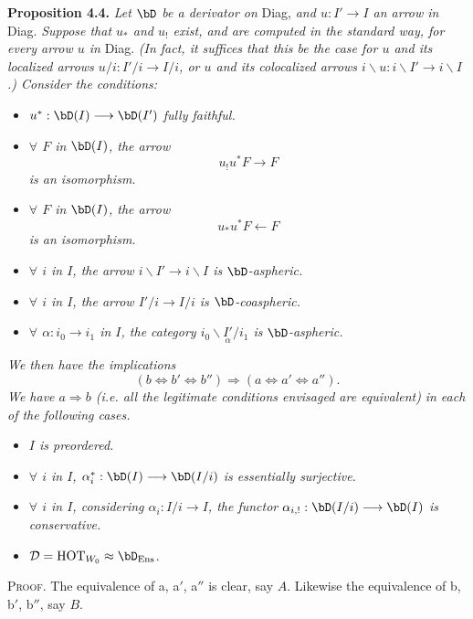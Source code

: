 \textbf{Proposition 4.4.} \textit{Let $\bD$ be a derivator on} Diag, \textit{and $u : I' \longrightarrow I$ an arrow in} Diag. \textit{Suppose that $u_*$ and $u_!$ exist, and are computed in the standard way, for every arrow $u$ in} Diag. \textit{(In fact, it suffices that this be the case for $u$ and its localized arrows $u/i : I'/i \longrightarrow I/i$, or $u$ and its colocalized arrows $i\backslash u : i\backslash I' \longrightarrow i\backslash I$.) Consider the conditions:} %
\begin{itemize}[leftmargin=4em]
\item[\textit{a)}] $u^* : \bD(I) \longrightarrow \bD(I')$ \textit{fully faithful.}
\item[\textit{a$'$)}] \textit{$\forall$ $F$ in $\bD(I)$, the arrow}
\[
u_!u^*F \longrightarrow F
\]
\textit{is an isomorphism.}
\item[\textit{a$''$)}] \textit{$\forall$ $F$ in $\bD(I)$, the arrow}
\[
u_*u^*F \longleftarrow F
\]
\textit{is an isomorphism.}
\item[\textit{b)}] \textit{$\forall$ $i$ in $I$, the arrow $i\backslash I' \longrightarrow i\backslash I$ is $\bD$-aspheric.}
\item[\textit{b$'$)}] \textit{$\forall$ $i$ in $I$, the arrow $I'/i \longrightarrow I/i$ is $\bD$-coaspheric.}
\item[\textit{b$''$)}] \textit{$\forall$ $\alpha : i_0 \longrightarrow i_1$ in $I$, the category $i_0\backslash\underset{\alpha}{I'}/i_1$ is $\bD$-aspheric.}
\end{itemize}
\textit{We then have the implications}
\[
(b \Longleftrightarrow b' \Longleftrightarrow b'') \Longrightarrow (a \Longleftrightarrow a' \Longleftrightarrow a'').
\]
\textit{We have $a \Longrightarrow b$ (i.e. all the legitimate conditions envisaged are equivalent)} \textit{in each of the following cases.}
\begin{itemize}[leftmargin=4em]
\item[$1^o$] \textit{$I$ is preordered.}
\item[$2^o$] \textit{$\forall$ $i$ in $I$, $\alpha_i^* : \bD(I) \longrightarrow \bD(I/i)$ is essentially surjective.}
\item[$3^o$] \textit{$\forall$ $i$ in $I$, considering $\alpha_i : I/i \longrightarrow I$, the functor $\alpha_{i,!} : \bD(I/i) \longrightarrow \bD(I)$ is conservative.}
\item[$4^o$] $\mathcal{D} = \mathrm{HOT}_{W_0} \approx \bD_{\mathrm{Ens}}$.
\end{itemize}
\textsc{Proof}. The equivalence of a, a$'$, a$''$ is clear, say $A$. Likewise the equivalence of b, b$'$, b$''$, say $B$. %

